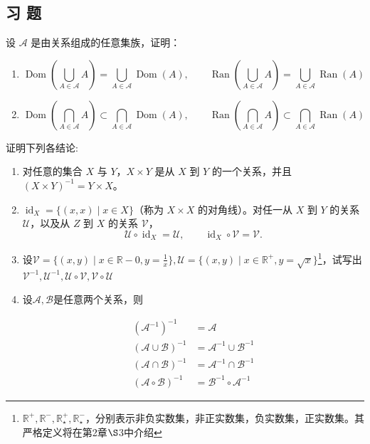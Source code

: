 \subsection{习 题}

\begin{exercise}
	\item 设 $\mathscr{A}$ 是由关系组成的任意集族，证明：
	\begin{enumerate}[label=\arabic*)]
		\item 
		\[
		\operatorname{Dom}\left(\bigcup_{A\in\mathscr{A}} A\right) = \bigcup_{A\in\mathscr{A}}\operatorname{Dom}(A),\qquad
		\operatorname{Ran}\left(\bigcup_{A\in\mathscr{A}} A\right) = \bigcup_{A\in\mathscr{A}}\operatorname{Ran}(A)
		\]
		\item 
		\[
		\operatorname{Dom}\left(\bigcap_{A\in\mathscr{A}} A\right) \subset \bigcap_{A\in\mathscr{A}}\operatorname{Dom}(A),\qquad
		\operatorname{Ran}\left(\bigcap_{A\in\mathscr{A}} A\right) \subset \bigcap_{A\in\mathscr{A}}\operatorname{Ran}(A)
		\]
	\end{enumerate}
\end{exercise}

\begin{exercise}
	\item 证明下列各结论:
	\begin{enumerate}[label=\arabic*)]
		\item 对任意的集合 $X$ 与 $Y$，$X \times Y$ 是从 $X$ 到 $Y$ 的一个关系，并且 $(X \times Y)^{-1} = Y \times X$。
		\item $\operatorname{id}_{X}=\{(x,x)\mid x\in X\}$（称为 $X\times X$ 的对角线）。对任一从 $X$ 到 $Y$ 的关系 $\mathscr{U}$，以及从 $Z$ 到 $X$ 的关系 $\mathscr{V}$，
		\[
		\mathscr{U}\circ \operatorname{id}_X = \mathscr{U},\qquad \operatorname{id}_X \circ \mathscr{V} = \mathscr{V}.
		\]
		\item 设$\mathscr{V} = \{ (x,y)\mid x\in\mathbb{R}-{0},y=\frac{1}{x} \}, \mathscr{U} = \{(x,y)\mid x\in\mathbb{R}^{+},y=\sqrt{x}\}$\footnote[1]{$\mathbb{R}^{+},\mathbb{R}^{-},\mathbb{R}^{+}_{\star},\mathbb{R}^{-}_{\star}$，分别表示非负实数集，非正实数集，负实数集，正实数集。其严格定义将在第2章$\S$3中介绍}，试写出$\mathscr{V}^{-1},\mathscr{U}^{-1},\mathscr{U}\circ\mathscr{V},\mathscr{V}\circ\mathscr{U}$
		\item 设$\mathscr{A},\mathscr{B}$是任意两个关系，则
		
		\begin{align*}
			(\mathscr{A}^{-1})^{-1} &= \mathscr{A} \\
			(\mathscr{A}\cup\mathscr{B})^{-1} &= \mathscr{A}^{-1}\cup\mathscr{B}^{-1} \\
			(\mathscr{A}\cap\mathscr{B})^{-1} &= \mathscr{A}^{-1}\cap\mathscr{B}^{-1} \\
			(\mathscr{A}\circ\mathscr{B})^{-1} &= \mathscr{B}^{-1}\circ\mathscr{A}^{-1}
		\end{align*}
		
	\end{enumerate}
\end{exercise}

